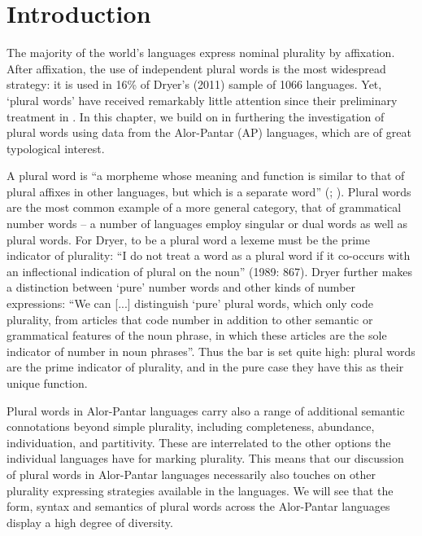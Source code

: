  
\section{Introduction}\label{sec:9:1}%
 
\hypertarget{Toc376962648}{}
The majority of the world's languages express nominal plurality by affixation. After affixation, the use of independent plural words is the most widespread strategy: it is used in 16\% of Dryer's (2011) sample of 1066 languages.\nocite{Dryer2011} Yet, `plural words' have received remarkably little attention since their preliminary treatment in \citet{Dryer1989}. In this chapter, we build on  \citet{SchapperEtAl2011plural} in furthering the investigation of plural words using data from the Alor-Pantar (AP) languages, which are of great typological interest.

A plural word is ``a morpheme whose meaning and function is similar to that of plural affixes in other languages, but which is a separate word'' (\citealt[865]{Dryer1989}; \citealt[166]{Dryer2007}). Plural words are the most common example of a more general category, that of grammatical number words -- a number of languages employ singular or dual words as well as plural words. For Dryer, to be a plural word a lexeme must be the prime indicator of plurality: ``I do not treat a word as a plural word if it co-occurs with an inflectional indication of plural on the noun'' (1989: 867). Dryer further makes a distinction between `pure' number words and other kinds of number expressions: ``We can [...] distinguish `pure' plural words, which only code plurality, from articles that code number in addition to other semantic or grammatical features of the noun phrase, in which these articles are the sole indicator of number in noun phrases''. Thus the bar is set quite high: plural words are the prime indicator of plurality, and in the
pure case they have this as their unique function.

 Plural words in Alor-Pantar languages carry also a range of additional semantic connotations beyond simple plurality, including completeness, abundance, individuation, and partitivity. These are interrelated to the other options the individual languages have for marking plurality. This means that our discussion of plural words in Alor-Pantar languages necessarily also touches on other plurality expressing strategies available in the languages. We will see that the form, syntax and semantics of plural words across the Alor-Pantar languages display a high degree of diversity.

